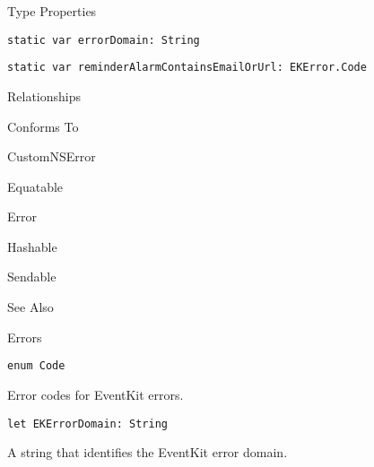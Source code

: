 \documentclass{article}
\begin{document}
Type Properties

\texttt{static var errorDomain: String}

\texttt{static var reminderAlarmContainsEmailOrUrl: EKError.Code}

Relationships

Conforms To

CustomNSError

Equatable

Error

Hashable

Sendable

See Also

Errors

\texttt{enum Code}

Error codes for EventKit errors.

\texttt{let EKErrorDomain: String}

A string that identifies the EventKit error domain.

\newpage
\end{document}
